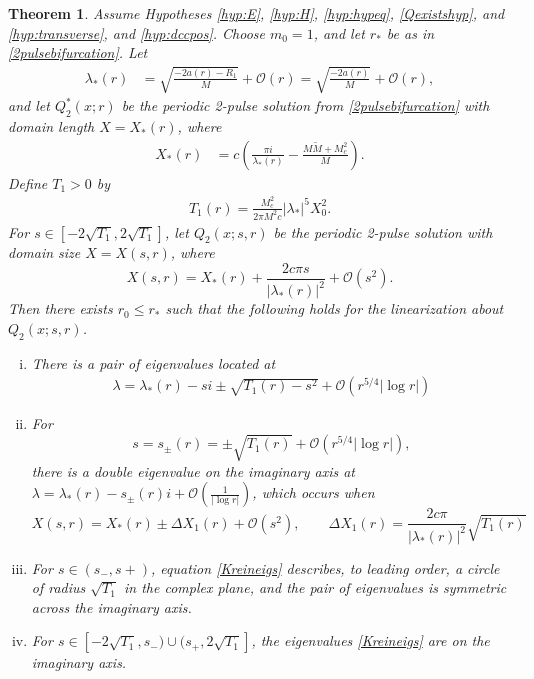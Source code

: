 \documentclass[10pt,reqno]{amsart}
\theoremstyle{plain}
\newtheorem{theorem}{Theorem}
\theoremstyle{definition}
\theoremstyle{remark}
\numberwithin{theorem}{section}
\numberwithin{equation}{section}
\begin{document}
\begin{theorem}\label{th:Kreinbubble}
Assume Hypotheses \ref{hyp:E}, \ref{hyp:H}, \ref{hyp:hypeq}, \ref{Qexistshyp}, and \ref{hyp:transverse}, and \ref{hyp:dccpos}. Choose $m_0 = 1$, and let $r_*$ be as in \cref{2pulsebifurcation}. Let 
\begin{align}\label{deflambdastar}
\lambda_*(r) &= \sqrt{ \frac{-2a(r) - R_1 }{M} } + \mathcal{O}(r) = \sqrt{ \frac{-2a(r)}{M} } + \mathcal{O}(r),
\end{align}
and let $Q_2^*(x; r)$ be the periodic 2-pulse solution from \cref{2pulsebifurcation} with domain length $X = X_*(r)$, where
\begin{align}\label{defXstar}
X_*(r) &= c \left( \frac{\pi i}{\lambda_*(r)} - \frac{M \tilde{M} + M_c^2 }{M}\right).
\end{align}
Define $T_1 > 0$ by 
\begin{align}\label{defT0}
T_1(r) = \frac{M_c^2 }{2 \pi M^2 c } |\lambda_*|^5 X_0^2.
\end{align}
For $s \in [-2\sqrt{T_1}, 2 \sqrt{T_1}]$, let $Q_2(x; s, r)$ be the periodic 2-pulse solution with domain size $X = X(s, r)$, where
\begin{equation}
X(s,r) = X_*(r) + \frac{2 c \pi s}{|\lambda_*(r)|^2} + \mathcal{O}(s^2).
\end{equation}
Then there exists $r_0 \leq r_*$ such that the following holds for the linearization about $Q_2(x; s, r)$.
\begin{enumerate}[(i)]
	\item There is a pair of eigenvalues located at
	\begin{align}\label{Kreineigs}
	\lambda = \lambda_*(r) - s i \pm \sqrt{ T_1(r) -  s^2} + \mathcal{O}\left(r^{5/4}|\log r| \right)
	\end{align}

	\item For
	\[
	s = s_\pm(r) = \pm \sqrt{T_1(r)} + \mathcal{O}\left(r^{5/4}|\log r| \right),
	\]
	there is a double eigenvalue on the imaginary axis at $\lambda = \lambda_*(r) - s_\pm(r) i + \mathcal{O}\left(\frac{1}{|\log r|} \right)$, which occurs when 
	\begin{equation}\label{KreinDeltaX}
	X(s, r) = X_*(r) \pm \Delta X_1(r) + \mathcal{O}(s^2), \qquad \Delta X_1(r) = \frac{2 c \pi}{|\lambda_*(r)|^2}\sqrt{T_1(r)} 
	\end{equation}
\item For $s \in (s_-, s+)$, equation \cref{Kreineigs} describes, to leading order, a circle of radius $\sqrt{T_1}$ in the complex plane, and the pair of eigenvalues is symmetric across the imaginary axis.
\item For $s \in [-2\sqrt{T_1}, s_-) \cup (s_+, 2 \sqrt{T_1}]$, the eigenvalues \cref{Kreineigs} are on the imaginary axis.
\end{enumerate}
\end{theorem}
\end{document}
